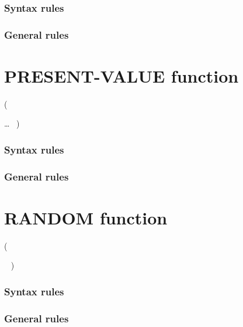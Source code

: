 \begin{syntax}
   
\end{syntax}

\subsubsection{Syntax rules}

\subsubsection{General rules}

\section{PRESENT-VALUE function}

\begin{syntax}
    (
  \begin{1=}
    \argument
  \end{1=} \ldots
  \ {})
\end{syntax}

\subsubsection{Syntax rules}

\subsubsection{General rules}

\section{RANDOM function}

\begin{syntax}
   
  \begin{0-1}
    (
    \begin{0-1}
      \argument
    \end{0-1} \gnucobol{\ldots}\ {}
    )
  \end{0-1}
\end{syntax}

\subsubsection{Syntax rules}

\subsubsection{General rules}

